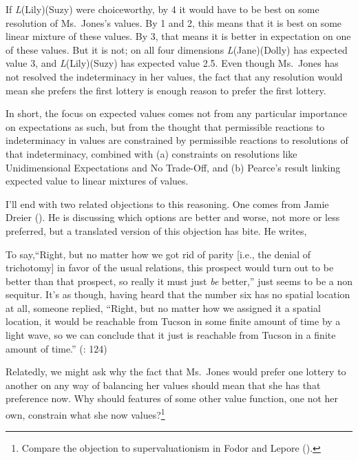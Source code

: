 \documentclass[
  10.5pt,
  twoside]{article}
\renewenvironment{quote}
  {\vskip 5pt%
   \list{}{
    \setlength{\listparindent}{.25in}
    \setlength{\leftmargin}{.25in}
    \setlength{\rightmargin}{\leftmargin}
    \setlength{\parsep}{0in plus 0in minus 0in}
    }
    \item\relax
    \let\item\relax}
  {\endlist\vskip 5pt}
\begin{document}
If \emph{L}(Lily)(Suzy) were choiceworthy, by 4 it would have to be best
on some resolution of Ms.~Jones's values. By 1 and 2, this means that it
is best on some linear mixture of these values. By 3, that means it is
better in expectation on one of these values. But it is not; on all four
dimensions \emph{L}(Jane)(Dolly) has expected value 3, and
\emph{L}(Lily)(Suzy) has expected value 2.5. Even though Ms.~Jones has
not resolved the indeterminacy in her values, the fact that any
resolution would mean she prefers the first lottery is enough reason to
prefer the first lottery.

In short, the focus on expected values comes not from any particular
importance on expectations as such, but from the thought that
permissible reactions to indeterminacy in values are constrained by
permissible reactions to resolutions of that indeterminacy, combined
with (a) constraints on resolutions like Unidimensional Expectations and
No Trade-Off, and (b) Pearce's result linking expected value to linear
mixtures of values.

I'll end with two related objections to this reasoning. One comes from
Jamie Dreier (). He is discussing which
options are better and worse, not more or less preferred, but a
translated version of this objection has bite. He writes,

\begin{quote}
To say,``Right, but no matter how we got rid of parity {[}i.e., the
denial of trichotomy{]} in favor of the usual relations, this prospect
would turn out to be better than that prospect, so really it must just
\emph{be} better,'' just seems to be a non sequitur. It's as though,
having heard that the number six has no spatial location at all, someone
replied, ``Right, but no matter how we assigned it a spatial location,
it would be reachable from Tucson in some finite amount of time by a
light wave, so we can conclude that it just is reachable from Tucson in
a finite amount of time.'' (: 124)
\end{quote}

Relatedly, we might ask why the fact that Ms.~Jones would prefer one
lottery to another on any way of balancing her values should mean that
she has that preference now. Why should features of some other value
function, one not her own, constrain what she now values?\footnote{Compare
  the objection to supervaluationism in Fodor and Lepore
  ().}
\end{document}
